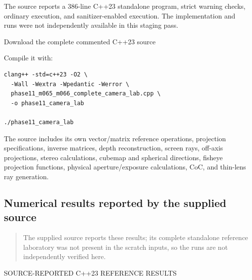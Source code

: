 \hypertarget{02-foundations-ii-ch037-standalone-camera-geometry-reference-laboratory-source-reported}{}

The source reports a 386-line C++23 standalone program, strict warning checks, ordinary execution, and sanitizer-enabled execution. The implementation and runs were not independently available in this staging pass.

Download the complete commented C++23 source

Compile it with:

\begin{verbatim}
clang++ -std=c++23 -O2 \
  -Wall -Wextra -Wpedantic -Werror \
  phase11_m065_m066_complete_camera_lab.cpp \
  -o phase11_camera_lab

./phase11_camera_lab
\end{verbatim}

The source includes its own vector/matrix reference operations, projection specifications, inverse matrices, depth reconstruction, screen rays, off-axis projections, stereo calculations, cubemap and spherical directions, fisheye projection functions, physical aperture/exposure calculations, CoC, and thin-lens ray generation.

\subsection{Numerical results reported by the supplied source}\label{02-foundations-ii-ch037-numerical-results-reported-by-the-supplied-source}

\hypertarget{02-foundations-ii-ch037-numerical-results-reported-by-the-supplied-source}{}

\begin{quote}
The supplied source reports these results; its complete standalone reference laboratory was not present in the scratch inputs, so the runs are not independently verified here.
\end{quote}

SOURCE-REPORTED C++23 REFERENCE RESULTS

